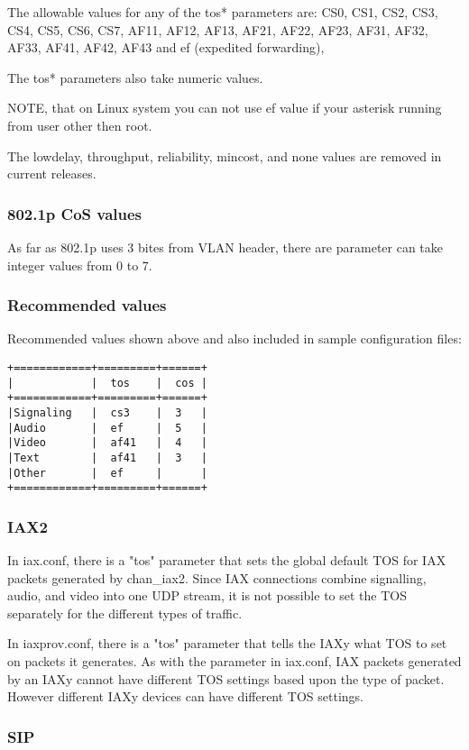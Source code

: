 The allowable values for any of the tos* parameters are: 
CS0, CS1, CS2, CS3, CS4, CS5, CS6, CS7, AF11, AF12, AF13, AF21, AF22, AF23, 
AF31, AF32, AF33, AF41, AF42, AF43 and ef (expedited forwarding),

The tos* parameters also take numeric values.

NOTE, that on Linux system you can not use ef value if your asterisk running
from user other then root.

The lowdelay, throughput, reliability, mincost, and none values are removed
in current releases.

\subsubsection{802.1p CoS values}

As far as 802.1p uses 3 bites from VLAN header, there are parameter can take
integer values from 0 to 7.

\subsubsection{Recommended values}
Recommended values shown above and also included in sample configuration files:
\begin{verbatim}
+============+=========+======+
|            |  tos    |  cos |
+============+=========+======+
|Signaling   |  cs3    |  3   |
|Audio       |  ef     |  5   |
|Video       |  af41   |  4   |
|Text        |  af41   |  3   |
|Other       |  ef     |      |
+============+=========+======+
\end{verbatim}

\subsubsection{IAX2}

In iax.conf, there is a "tos" parameter that sets the global default TOS
for IAX packets generated by chan\_iax2.  Since IAX connections combine
signalling, audio, and video into one UDP stream, it is not possible
to set the TOS separately for the different types of traffic.

In iaxprov.conf, there is a "tos" parameter that tells the IAXy what TOS
to set on packets it generates.  As with the parameter in iax.conf,
IAX packets generated by an IAXy cannot have different TOS settings
based upon the type of packet.  However different IAXy devices can
have different TOS settings.

\subsubsection{SIP}

